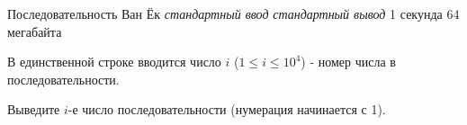 \begin{problem}%
{Последовательность Ван Ёк}%
{\textsl{стандартный ввод}}%
{\textsl{стандартный вывод}}%
{1 секунда}%
{64 мегабайта}{}

\InputFile

В единственной строке вводится число $i$ ($1 \le i \le 10^4$) - номер числа в последовательности.

\OutputFile

Выведите $i$-е число последовательности (нумерация начинается с 1).

\Examples

\begin{example}
%
%
%
\end{example}
\end{problem}
